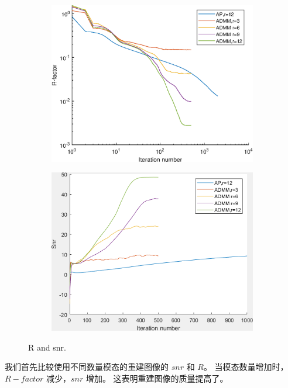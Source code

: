 \documentclass[12pt]{article}
\begin{document}
\begin{figure}[H]
	\begin{subfigure}{.5\textwidth}
		\centering
		\includegraphics[width=0.9\linewidth]{../figures/modes_R.eps}  
		\label{fig:modes_R}
	\end{subfigure}
	\begin{subfigure}{.5\textwidth}
		\centering
		\includegraphics[width=.9\linewidth]{../figures/modes_snr.png}  
		\label{fig:modes_snr}
	\end{subfigure}
	\caption{R and snr. }
	\label{fig:noise}
\end{figure}


我们首先比较使用不同数量模态的重建图像的 $snr$ 和 $R$。 当模态数量增加时，$R-factor$ 减少，$snr$ 增加。 这表明重建图像的质量提高了。
\end{document}
